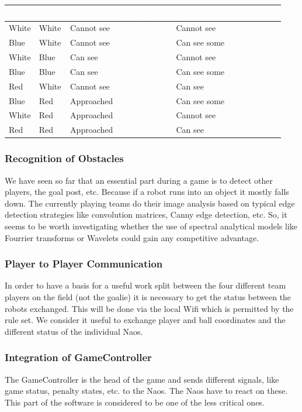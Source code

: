 \documentclass[12pt]{article}
\theoremstyle{definition}
\begin{document}
\begin{tabular}{|p{.08\linewidth}|p{.08\linewidth}|p{.31\linewidth}|p{.31\linewidth}|}
\hline
\cellcolor[gray]{0.5}\textcolor{white}{Left} & \cellcolor[gray]{0.45}\textcolor{white}{Right} & \cellcolor[gray]{0.5}\textcolor{white}{Ball Recognition Status} & \cellcolor[gray]{0.45}\textcolor{white}{Goal Recognition Status}\\ \hline
White&White&Cannot see & Cannot see \\ \hline
Blue&White&Cannot see & Can see some \\ \hline
White&Blue&Can see & Cannot see \\ \hline 
Blue&Blue&Can see & Can see some \\ \hline
Red&White& Cannot see & Can see \\ \hline
Blue&Red&Approached & Can see some \\ \hline
White&Red&Approached & Cannot see  \\ \hline
Red&Red& Approached & Can see \\ \hline
\end{tabular}

\subsubsection{Recognition of Obstacles}
We have seen so far that an essential part during a game is to detect other players, the goal post, etc. Because if a robot runs into an object it mostly falls down. The currently playing teams do their image analysis based on typical edge detection strategies like convolution matrices, Canny edge detection, etc. So, it seems to be worth investigating whether the use of spectral analytical models like Fourrier transforms or Wavelets could gain any competitive advantage.

\subsubsection{Player to Player Communication}
In order to have a basis for a useful work split between the four different team players on the field (not the goalie) it is necessary to get the status between the robots exchanged. This will be done via the local Wifi which is permitted by the rule set. We consider it useful to exchange player and ball coordinates and the different status of the individual Naos.

\subsubsection{Integration of GameController}
The GameController is the head of the game and sends different signals, like game status, penalty states, etc. to the Naos. The Naos have to react on these. This part of the software is considered to be one of the less critical ones.
\end{document}
